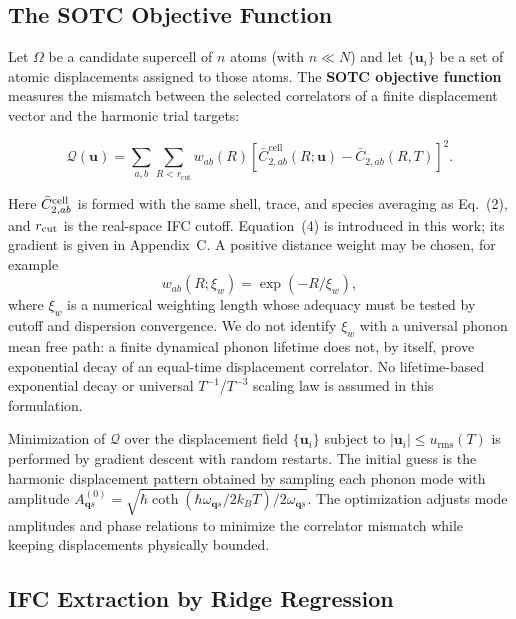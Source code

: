 \documentclass[aps,prb,reprint,amsmath,amssymb,floatfix]{revtex4-2}
\begin{document}
\subsection{The SOTC Objective
Function}\label{the-sotc-objective-function}

\color{revisionblue}
Let \(\Omega\) be a candidate supercell of \(n\) atoms (with
\(n \ll N\)) and let \(\{\mathbf{u}_i\}\) be a set of atomic
displacements assigned to those atoms.
The \textbf{SOTC objective function} measures the mismatch between the
selected correlators of a finite displacement vector and the harmonic trial
targets:
\color{black}

\color{revisionblue}
\begin{equation}
\mathcal{Q}(\mathbf{u}) = \sum_{a,b}\sum_{R<r_\text{cut}} w_{ab}(R)
\left[\bar{C}_{2,ab}^\text{cell}(R;\mathbf u)
- \bar{C}_{2,ab}(R,T)\right]^2 .
\end{equation}
\color{black}

\color{revisionblue}
Here \(\bar C_{2,ab}^{\rm cell}\) is formed with the same shell, trace, and
species averaging as Eq.~(2), and \(r_{\rm cut}\) is the real-space IFC
cutoff. Equation~(4) is introduced in this work; its gradient is given in
Appendix~C. A positive distance weight may be chosen, for example
\begin{equation}
w_{ab}(R;\xi_w)=\exp(-R/\xi_w),
\end{equation}
where \(\xi_w\) is a numerical weighting length whose adequacy must be tested
by cutoff and dispersion convergence. We do not identify \(\xi_w\) with a
universal phonon mean free path: a finite dynamical phonon lifetime does not,
by itself, prove exponential decay of an equal-time displacement correlator.
No lifetime-based exponential decay or universal
\(T^{-1}\)/\(T^{-3}\) scaling law is assumed in this formulation.
\color{black}

Minimization of \(\mathcal{Q}\) over the displacement field
\(\{\mathbf{u}_i\}\) subject to \(|\mathbf{u}_i| \leq u_\text{rms}(T)\)
is performed by gradient descent with random restarts. The initial guess
is the harmonic displacement pattern obtained by sampling each phonon
mode with amplitude
\(A_{\mathbf{q}s}^{(0)} = \sqrt{\hbar\coth(\hbar\omega_{\mathbf{q}s}/2k_BT)/2\omega_{\mathbf{q}s}}\).
The optimization adjusts mode amplitudes and phase relations to minimize
the correlator mismatch while keeping displacements physically bounded.

\subsection{IFC Extraction by Ridge
Regression}\label{ifc-extraction-by-ridge-regression}
\end{document}
